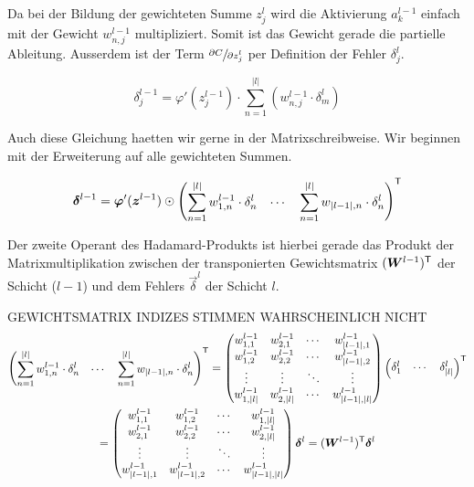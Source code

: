 Da bei der Bildung der gewichteten Summe $z_j^l$ wird die Aktivierung
$a_k^{l-1}$ einfach mit der Gewicht $w_{n,j}^{l-1}$ multipliziert. Somit ist das
Gewicht gerade die partielle Ableitung. Ausserdem ist der Term
$\sfrac{\partial C}{\partial z_j^l}$ per Definition der Fehler $\delta_j^l$.

\begin{equation}\tag{BP2}
  \delta_j^{l-1} = \varphi'(z_j^{l-1}) \cdot \sum_{n=1}^{|l|} \left( w_{n,j}^{l-1} \cdot \delta_m^l \right)
\end{equation}

Auch diese Gleichung haetten wir gerne in der Matrixschreibweise. Wir beginnen
mit der Erweiterung auf alle gewichteten Summen.

\begin{equation*}
  \bm{\delta}^{l-1} = \bm{\varphi}'(\bm{z}^{l-1}) \odot \begin{pmatrix} \displaystyle\sum_{n=1}^{|l|} w_{1,n}^{l-1} \cdot \delta_n^l & \cdots & \displaystyle\sum_{n=1}^{|l|} w_{|l-1|,n} \cdot \delta_n^l \end{pmatrix}^{\mathsf{T}}
\end{equation*}

Der zweite Operant des Hadamard-Produkts ist hierbei gerade das Produkt der
Matrixmultiplikation zwischen
der transponierten Gewichtsmatrix $(\bm{W}^{l-1})^{\mathsf{T}}$ der Schicht ($l-1$)
und dem Fehlers $\vec{\delta}^l$ der Schicht $l$.

GEWICHTSMATRIX INDIZES STIMMEN WAHRSCHEINLICH NICHT
\begin{gather*}
  \begin{pmatrix} \displaystyle\sum_{n=1}^{|l|} w_{1,n}^{l-1} \cdot \delta_n^l & \cdots & \displaystyle\sum_{n=1}^{|l|} w_{|l-1|,n} \cdot \delta_n^l \end{pmatrix}^{\mathsf{T}} =
  \begin{pmatrix}
    w_{1,1}^{l-1} & w_{2,1}^{l-1} & \cdots & w_{|l-1|,1}^{l-1} \\
    w_{1,2}^{l-1} & w_{2,2}^{l-1} & \cdots & w_{|l-1|,2}^{l-1} \\
    \vdots & \vdots & \ddots & \vdots \\
    w_{1,|l|}^{l-1} & w_{2,|l|}^{l-1} & \cdots & w_{|l-1|,|l|}^{l-1}
  \end{pmatrix}
  \begin{pmatrix} \delta_1^l & \cdots & \delta_{|l|}^l \end{pmatrix}^{\mathsf{T}} \\=
  \begin{pmatrix}
    w_{1,1}^{l-1} & w_{1,2}^{l-1} & \cdots & w_{1,|l|}^{l-1} \\
    w_{2,1}^{l-1} & w_{2,2}^{l-1} & \cdots & w_{2,|l|}^{l-1} \\
    \vdots & \vdots & \ddots & \vdots \\
    w_{|l-1|,1}^{l-1} & w_{|l-1|,2}^{l-1} & \cdots & w_{|l-1|,|l|}^{l-1}
  \end{pmatrix}
  \bm{\delta}^l = (\bm{W}^{l-1})^{\mathsf{T}} \bm{\delta}^l
\end{gather*}

